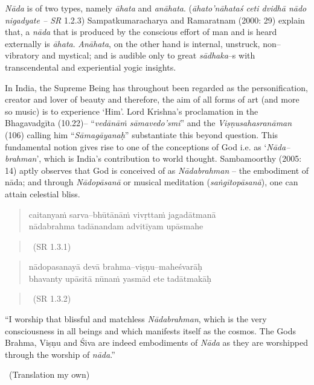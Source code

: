 \textit{Nāda} is of two types, namely \textit{āhata} and \textit{anāhata}. (\textit{āhato’nāhataś ceti dvidhā nādo nigadyate – SR} 1.2.3) Sampatkumaracharya and Ramaratnam (2000: 29) explain that, a \textit{nāda} that is produced by the conscious effort of man and is heard externally is \textit{āhata}. \textit{Anāhata}, on the other hand is internal, unstruck, non–vibratory and mystical; and is audible only to great \textit{sādhaka}–s with transcendental and experiential yogic insights.

In India, the Supreme Being has throughout been regarded as the personification, creator and lover of beauty and therefore, the aim of all forms of art (and more so music) is to experience ‘Him’. Lord Krishna’s proclamation in the Bhagavadgīta (10.22)– “\textit{vedānāṁ sāmavedo’smi}” and the \textit{Viṣṇusahasranāman} (106) calling him “\textit{Sāmagāyanaḥ}” substantiate this beyond question. This fundamental notion gives rise to one of the conceptions of God i.e. as ‘\textit{Nāda–brahman}’, which is India’s contribution to world thought. Sambamoorthy (2005: 14) aptly observes that God is conceived of as \textit{Nādabrahman} – the embodiment of nāda; and through \textit{Nādopāsanā} or musical meditation (\textit{saṅgītopāsanā}), one can attain celestial bliss.

\begin{verse}
caitanyaṁ sarva–bhūtānāṁ vivṛttaṁ jagadātmanā \\ nādabrahma tadānandam advitīyam upāsmahe 
\end{verse}

\vspace{-.5cm}

\begin{verse}

~\hfill (SR 1.3.1)
\end{verse}

\begin{verse}
nādopasanayā devā brahma–viṣṇu–maheśvarāḥ \\ bhavanty upāsitā nūnaṁ yasmād ete tadātmakāḥ 
\end{verse}

\vspace{-.5cm}

\begin{verse}

~\hfill (SR 1.3.2)
\end{verse}

\begin{myquote}
“I worship that blissful and matchless \textit{Nādabrahman}, which is the very consciousness in all beings and which manifests itself as the cosmos. The Gods Brahma, Viṣṇu and Śiva are indeed embodiments of \textit{Nāda} as they are worshipped through the worship of \textit{nāda}.” 

~\hfill (Translation my own)
\end{myquote}

